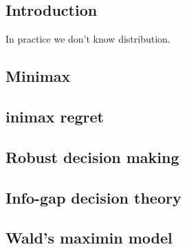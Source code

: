 
\subsection{Introduction}

In practice we don't know distribution.

\subsection{Minimax}

\subsection{inimax regret}

\subsection{Robust decision making}

\subsection{Info-gap decision theory}

\subsection{Wald's maximin model}

